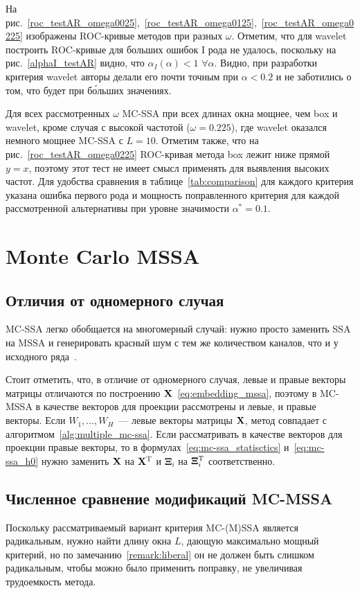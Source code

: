 \documentclass[specialist,
substylefile = spbu_report.rtx,
subf,href,colorlinks=true, 12pt]{disser}
\theoremstyle{definition}
\begin{document}

На рис.~\ref{roc_testAR_omega0025},~\ref{roc_testAR_omega0125},~\ref{roc_testAR_omega0225} изображены ROC-кривые методов при разных $\omega$. Отметим, что для wavelet построить ROC-кривые для больших ошибок I рода не удалось, поскольку на рис.~\ref{alphaI_testAR} видно, что $\alpha_I(\alpha) < 1$ $\forall \alpha$. Видно, при разработки критерия wavelet авторы делали его почти точным при $\alpha < 0.2$ и не заботились о том, что будет при б\'{о}льших значениях.

Для всех рассмотренных $\omega$ MC-SSA при всех длинах окна мощнее, чем box и wavelet, кроме случая с высокой частотой ($\omega=0.225$), где wavelet оказался немного мощнее MC-SSA с $L=10$. Отметим также, что на рис.~\ref{roc_testAR_omega0225} ROC-кривая метода box лежит ниже прямой $y=x$, поэтому этот тест не имеет смысл применять для выявления высоких частот. Для удобства сравнения в таблице~\ref{tab:comparison} для каждого критерия указана ошибка первого рода и мощность поправленного критерия для каждой рассмотренной альтернативы при уровне значимости $\alpha^*=0.1$.

\section{Monte Carlo MSSA}\label{sect:mc-mssa}
\subsection{Отличия от одномерного случая}
MC-SSA легко обобщается на многомерный случай: нужно просто заменить SSA на MSSA и генерировать красный шум с тем же количеством каналов, что и у исходного ряда~\cite{Groth2015}.

Стоит отметить, что, в отличие от одномерного случая, левые и правые векторы матрицы отличаются по построению $\mathbf{X}$~\eqref{eq:embedding_mssa}, поэтому в MC-MSSA в качестве векторов для проекции рассмотрены и левые, и правые векторы. Если $W_1,\ldots,W_H$~--- левые векторы матрицы $\mathbf{X}$, метод совпадает с алгоритмом~\ref{alg:multiple_mc-ssa}. Если рассматривать в качестве векторов для проекции правые векторы, то в формулах~\eqref{eq:mc-ssa_statisctics} и~\eqref{eq:mc-ssa_h0} нужно заменить $\mathbf{X}$ на $\mathbf{X}^{\mathrm{T}}$ и $\mathbf{\Xi}_i$ на $\mathbf{\Xi}_i^{\mathrm{T}}$ соответственно.

\subsection{Численное сравнение модификаций MC-MSSA}\label{sect:mc-mssa_numeric_comparison}
Поскольку рассматриваемый вариант критерия MC-(M)SSA является радикальным, нужно найти длину окна $L$, дающую максимально мощный критерий, но по замечанию~\ref{remark:liberal} он не должен быть слишком радикальным, чтобы можно было применить поправку, не увеличивая трудоемкость метода.
\end{document}
